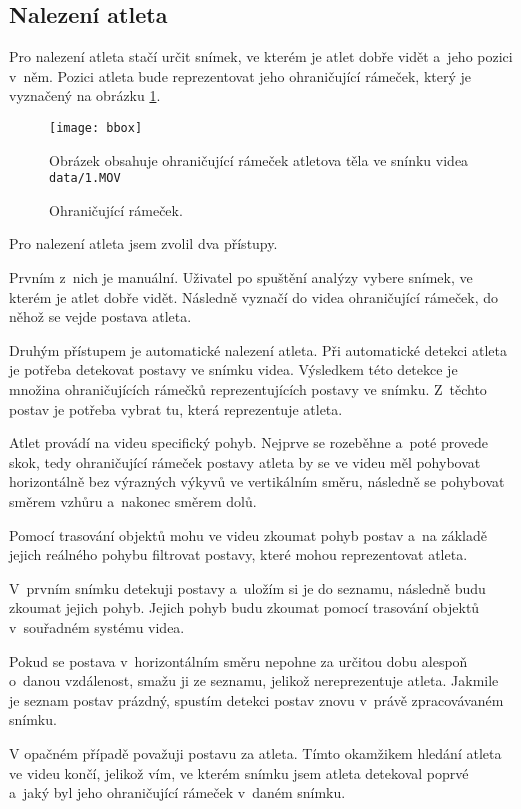 \subsection{Nalezení atleta}

Pro nalezení atleta stačí určit snímek, ve kterém je atlet dobře vidět a~jeho pozici v~něm. Pozici atleta bude reprezentovat jeho ohraničující rámeček, který je vyznačený na obrázku \ref{fig:bbox}.

\begin{figure}[h]\centering
\texttt{[image: bbox]}
\caption{Ohraničující rámeček.}
\small
Obrázek obsahuje ohraničující rámeček atletova těla ve snínku videa \texttt{data/1.MOV}
\label{fig:bbox}
\end{figure}

Pro nalezení atleta jsem zvolil dva přístupy.

Prvním z~nich je manuální. Uživatel po spuštění analýzy vybere snímek, ve kterém je atlet dobře vidět. Následně vyznačí do videa ohraničující rámeček, do něhož se vejde postava atleta.

Druhým přístupem je automatické nalezení atleta. Při automatické detekci atleta je potřeba detekovat postavy ve snímku videa. Výsledkem této detekce je množina ohraničujících rámečků reprezentujících postavy ve snímku. Z~těchto postav je potřeba vybrat tu, která reprezentuje atleta.

Atlet provádí na videu specifický pohyb. Nejprve se rozeběhne a~poté provede skok, tedy ohraničující rámeček postavy atleta by se ve videu měl pohybovat horizontálně bez výrazných výkyvů ve vertikálním směru, následně se pohybovat směrem vzhůru a~nakonec směrem dolů.

Pomocí trasování objektů mohu ve videu zkoumat pohyb postav a~na základě jejich reálného pohybu filtrovat postavy, které mohou reprezentovat atleta.

V~prvním snímku detekuji postavy a~uložím si je do seznamu, následně budu zkoumat jejich pohyb. Jejich pohyb budu zkoumat pomocí trasování objektů v~souřadném systému videa.

Pokud se postava v~horizontálním směru nepohne za určitou dobu alespoň o~danou vzdálenost, smažu ji ze seznamu, jelikož nereprezentuje atleta. Jakmile je seznam postav prázdný, spustím detekci postav znovu v~právě zpracovávaném snímku.

V opačném případě považuji postavu za atleta. Tímto okamžikem hledání atleta ve videu končí, jelikož vím, ve kterém snímku jsem atleta detekoval poprvé a~jaký byl jeho ohraničující rámeček v~daném snímku.


